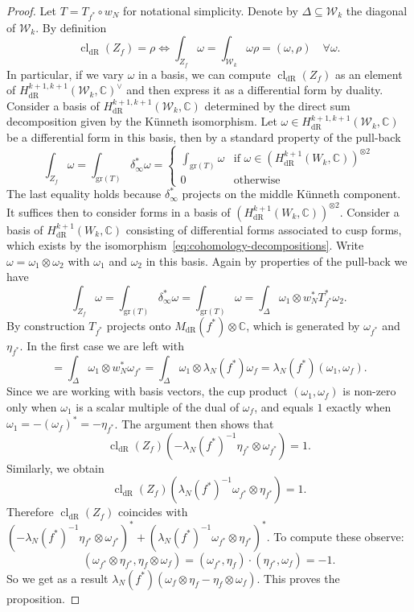 \documentclass[11pt, a4paper, reqno]{amsart}
\theoremstyle{definition}
\theoremstyle{plain}
\theoremstyle{remark}
\DeclareMathOperator{\cl}{cl}
\DeclareMathOperator{\dR}{dR}
\newcommand{\numberset}{\mathbb}
\newcommand{\C}{\numberset{C}}
\newcommand{\KS}{\mathscr{W}}
\begin{document}
\begin{proof}
    Let $T = T_{f^*} \circ w_N$ for notational simplicity. Denote by $\Delta \subseteq \KS_k$ the diagonal of $\KS_k$. By definition
    \[
        \cl_{\dR}(Z_f) = \rho \iff \int_{Z_f} \omega = \int_{\KS_k} \omega\rho = (\omega,\rho) \quad \forall \omega.
    \]
    In particular, if we vary $\omega$ in a basis, we can compute $\cl_{\dR}(Z_f)$ as an element of $H^{k+1,k+1}_{\dR}(\KS_k,\C)^{\vee}$ and then express it as a differential form by duality.
    Consider a basis of $H^{k+1,k+1}_{\dR}(\KS_k,\C)$ determined by the direct sum decomposition given by the Künneth isomorphism. Let $\omega \in H^{k+1,k+1}_{\dR}(\KS_k,\C)$ be a differential form in this basis, then by a standard property of the pull-back
    \[
        \int_{Z_f} \omega = \int_{\mathrm{gr}(T)} \delta_{\infty}^* \omega = \begin{cases}
            \int_{\mathrm{gr}(T)}\omega &\text{if $\omega \in (H^{k+1}_{\dR}(W_k,\C))^{\otimes 2}$} \\
            0 &\text{otherwise}
        \end{cases}
    \]
    The last equality holds because $\delta_{\infty}^*$ projects on the middle Künneth component. It suffices then to consider forms in a basis of $(H^{k+1}_{\dR}(W_k,\C))^{\otimes 2}$. Consider a basis of $H^{k+1}_{\dR}(W_k,\C)$ consisting of differential forms associated to cusp forms, which exists by the isomorphism~\eqref{eq:cohomology-decompositions}.
    Write $\omega = \omega_1 \otimes \omega_2$ with $\omega_1$ and $\omega_2$ in this basis. Again by properties of the pull-back we have
    \[
        \int_{Z_f} \omega = \int_{\mathrm{gr}(T)} \delta_{\infty}^* \omega = \int_{\mathrm{gr}(T)} \omega = \int_{\Delta} \omega_1 \otimes w_N^* T_{f^*}^* \omega_2.
    \]
    By construction $T_{f^*}$ projects onto $M_{\dR}(f^*)\otimes \C$, which is generated by $\omega_{f^*}$ and $\eta_{f^*}$. In the first case we are left with
    \[
     = \int_{\Delta} \omega_1 \otimes w_N^* \omega_{f^*} = \int_{\Delta} \omega_1 \otimes \lambda_N(f^*)\omega_f = \lambda_N(f^*)(\omega_1,\omega_f).
    \]
 Since we are working with basis vectors, the cup product $(\omega_1,\omega_f)$ is non-zero only when $\omega_1$ is a scalar multiple of the dual of $\omega_f$, and equals $1$ exactly when $\omega_1 = -(\omega_f)^* = -\eta_{f^*}$. The argument then shows that
   \[
     \cl_{\dR}(Z_f)(-\lambda_N(f^*)^{-1}\eta_{f^*}\otimes\omega_{f^*}) = 1. \]
  Similarly, we obtain
  \[\cl_{\dR}(Z_f)(\lambda_N(f^*)^{-1}\omega_{f^*}\otimes\eta_{f^*}) = 1.\]
 Therefore $\cl_{\dR}(Z_f)$ coincides with $(-\lambda_N(f^*)^{-1}\eta_{f^*} \otimes \omega_{f^*})^* + (\lambda_N(f^*)^{-1}\omega_{f^*} \otimes \eta_{f^*})^*$. To compute these observe:
    \[
        (\omega_{f^*}\otimes \eta_{f^*},\eta_f\otimes \omega_f) = (\omega_{f^*},\eta_f)\cdot (\eta_{f^*},\omega_f) = -1.
    \]
 So we get as a result $\lambda_N(f^*)(\omega_f \otimes \eta_f -\eta_f\otimes \omega_f )$. This proves the proposition.
\end{proof}
\end{document}
